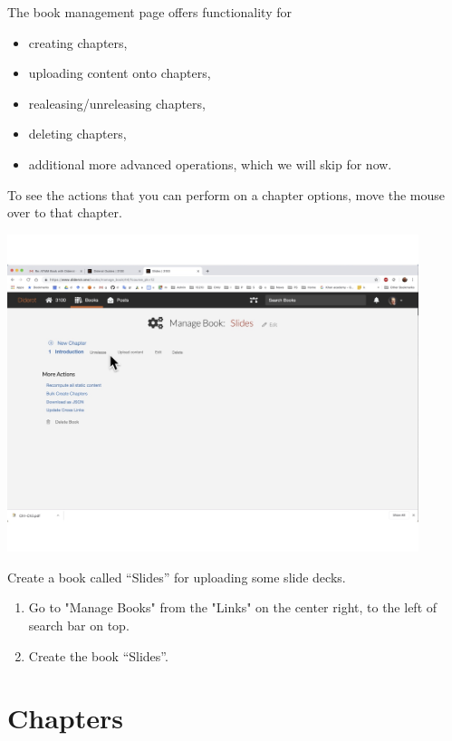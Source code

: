 \begin{gram}
The book management page offers functionality for
\begin{itemize}
\item creating chapters,
\item uploading content onto chapters,
\item realeasing/unreleasing chapters,
\item deleting chapters,
\item additional more advanced operations, which we will skip for now.
\end{itemize}

To see the actions that you can perform on a chapter options, move the mouse over to that chapter. 

\includegraphics[width=0.9\textwidth]{lms/media/book-management.jpg}
\end{gram}

\begin{exercise}
Create a book called ``Slides'' for uploading some slide decks. 
\begin{enumerate}
\item Go to "Manage Books" from the "Links" on the center right, to
the left of search bar on top.
\item Create the book ``Slides''.
\end{enumerate}
\end{exercise}

\section{Chapters}
\label{guide:chapter}

